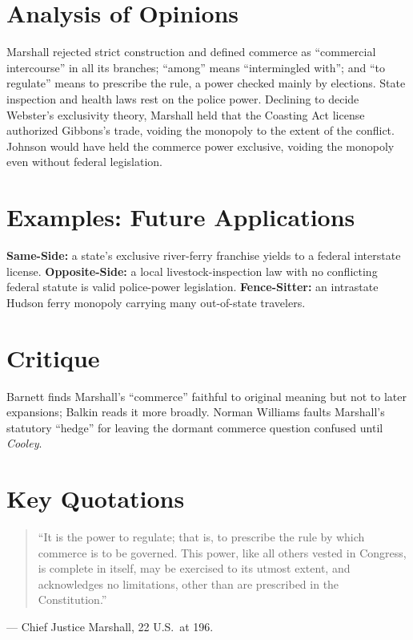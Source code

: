 \documentclass[12pt]{article}
\begin{document}
\section{Analysis of Opinions}
Marshall rejected strict construction and defined commerce as ``commercial intercourse'' in all its branches; ``among'' means ``intermingled with''; and ``to regulate'' means to prescribe the rule, a power checked mainly by elections. State inspection and health laws rest on the police power. Declining to decide Webster's exclusivity theory, Marshall held that the Coasting Act license authorized Gibbons's trade, voiding the monopoly to the extent of the conflict. Johnson would have held the commerce power exclusive, voiding the monopoly even without federal legislation.

\section{Examples: Future Applications}
\textbf{Same-Side:} a state's exclusive river-ferry franchise yields to a federal interstate license. \textbf{Opposite-Side:} a local livestock-inspection law with no conflicting federal statute is valid police-power legislation. \textbf{Fence-Sitter:} an intrastate Hudson ferry monopoly carrying many out-of-state travelers.

\section{Critique}
Barnett finds Marshall's ``commerce'' faithful to original meaning but not to later expansions; Balkin reads it more broadly. Norman Williams faults Marshall's statutory ``hedge'' for leaving the dormant commerce question confused until \textit{Cooley}.

\section{Key Quotations}
\begin{quote}
``It is the power to regulate; that is, to prescribe the rule by which commerce is to be governed. This power, like all others vested in Congress, is complete in itself, may be exercised to its utmost extent, and acknowledges no limitations, other than are prescribed in the Constitution.''
\end{quote}
\noindent --- Chief Justice Marshall, 22 U.S.\ at 196.
\end{document}
